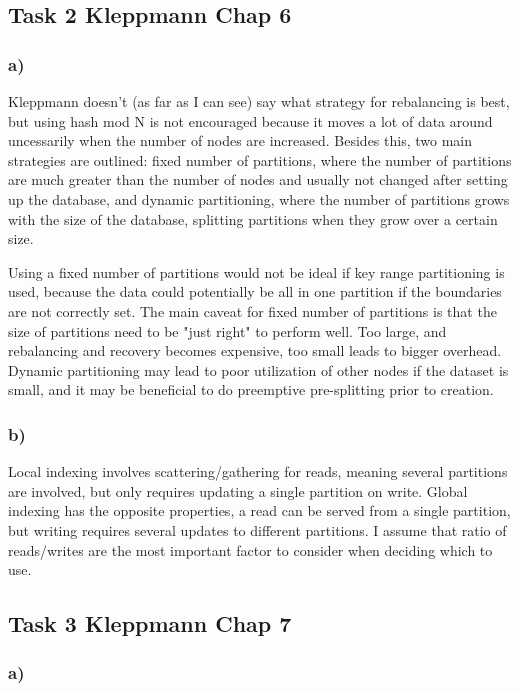 \documentclass[12pt, titlepage]{report}
\begin{document}
\subsection*{Task 2 Kleppmann Chap 6}
\subsubsection{a)}
Kleppmann doesn't (as far as I can see) say what strategy for rebalancing is best, but using hash mod N is not encouraged because it moves a lot of data around uncessarily when the number of nodes are increased. Besides this, two main strategies are outlined: fixed number of partitions, where the number of partitions are much greater than the number of nodes and usually not changed after setting up the database, and dynamic partitioning, where the number of partitions grows with the size of the database, splitting partitions when they grow over a certain size.

Using a fixed number of partitions would not be ideal if key range partitioning is used, because the data could potentially be all in one partition if the boundaries are not correctly set. The main caveat for fixed number of partitions is that the size of partitions need to be "just right" to perform well. Too large, and rebalancing and recovery becomes expensive, too small leads to bigger overhead. Dynamic partitioning may lead to poor utilization of other nodes if the dataset is small, and it may be beneficial to do preemptive pre-splitting prior to creation.
\subsubsection{b)}
Local indexing involves scattering/gathering for reads, meaning several partitions are involved, but only requires updating a single partition on write. Global indexing has the opposite properties, a read can be served from a single partition, but writing requires several updates to different partitions. I assume that ratio of reads/writes are the most important factor to consider when deciding which to use. 
\subsection*{Task 3 Kleppmann Chap 7}
\subsubsection{a)}
\end{document}
